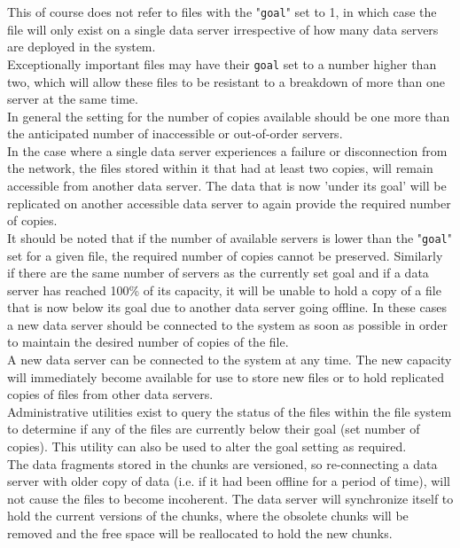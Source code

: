 \documentclass[a4paper,11pt,english]{report}
\def\code#1{\texttt{#1}}
\begin{document}
		This of course does not refer to files with the "\code{goal}" set to 1, in which case the file will only exist on a single data server irrespective of how many data servers are deployed in the system.\\
		
		Exceptionally important files may have their \code{goal} set to a number higher than two, which will allow these files to be resistant to a breakdown of more than one server at the same time.\\
		
		In general the setting for the number of copies available should be one more than the anticipated number of inaccessible or out-of-order servers.\\
		
		In the case where a single data server experiences a failure or disconnection from the network, the files stored within it that had at least two copies, will remain accessible from another data server. The data that is now 'under its goal' will be replicated on another accessible data server to again provide the required number of copies.\\
		
		It should be noted that if the number of available servers is lower than the "\code{goal}" set for a given file, the required number of copies cannot be preserved. Similarly if there are the same number of servers as the currently set goal and if a data server has reached 100\% of its capacity, it will be unable to hold a copy of a file that is now below its goal due to another data server going offline.  In these cases a new data server should be connected to the system as soon as possible in order to maintain the desired number of copies of the file.\\
		
		A new data server can be connected to the system at any time.  The new capacity will immediately become available for use to store new files or to hold replicated copies of files from other data servers.\\
		
		Administrative utilities exist to query the status of the files within the file system to determine if any of the files are currently below their goal (set number of copies). This utility can also be used to alter the goal setting as required.\\
		
		The data fragments stored in the chunks are versioned, so re-connecting a data server with older copy of data (i.e. if it had been offline for a period of time), will not cause the files to become incoherent. The data server will synchronize itself to hold the current versions of the chunks, where the obsolete chunks will be removed and the free space will be reallocated to hold the new chunks.\\
		
\end{document}
